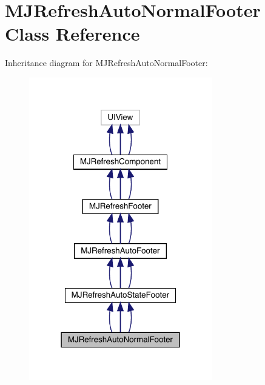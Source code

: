 \hypertarget{interface_m_j_refresh_auto_normal_footer}{}\section{M\+J\+Refresh\+Auto\+Normal\+Footer Class Reference}
\label{interface_m_j_refresh_auto_normal_footer}


Inheritance diagram for M\+J\+Refresh\+Auto\+Normal\+Footer\+:\nopagebreak
\begin{figure}[H]
\begin{center}
\leavevmode
\includegraphics[width=226pt]{interface_m_j_refresh_auto_normal_footer__inherit__graph}
\end{center}
\end{figure}


